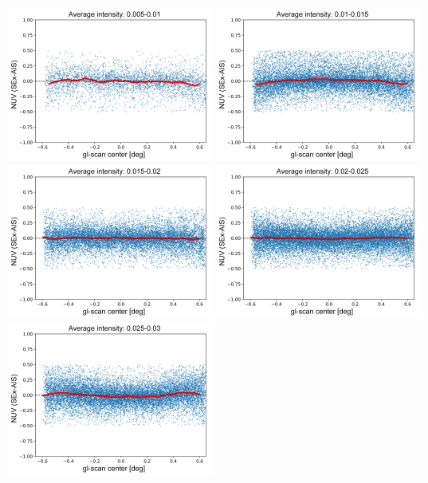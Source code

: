 \documentclass[12pt, preprint]{aastex61}
\begin{document}
\begin{figure}[p]
\begin{center}
\includegraphics[width=0.48\textwidth]{figures/cr1-new}
\includegraphics[width=0.48\textwidth]{figures/cr2-new}
\includegraphics[width=0.48\textwidth]{figures/cr3-new}
\includegraphics[width=0.48\textwidth]{figures/cr4-new}
\includegraphics[width=0.48\textwidth]{figures/cr5-new}

\end{center}
\end{figure}
\end{document}
